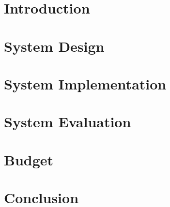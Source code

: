 \documentclass[11pt]{report}
\begin{document}
	\pagestyle{plain}
	

	

	\tableofcontents

	\listoffigures

	\listoftables

	\pagestyle{fancy}

	\chapter{Introduction}	%
	
	

	\chapter{System Design}
	

	\chapter{System Implementation}
	

	\chapter{System Evaluation}
	

	\chapter{Budget}

	\chapter{Conclusion}
	
\end{document}
